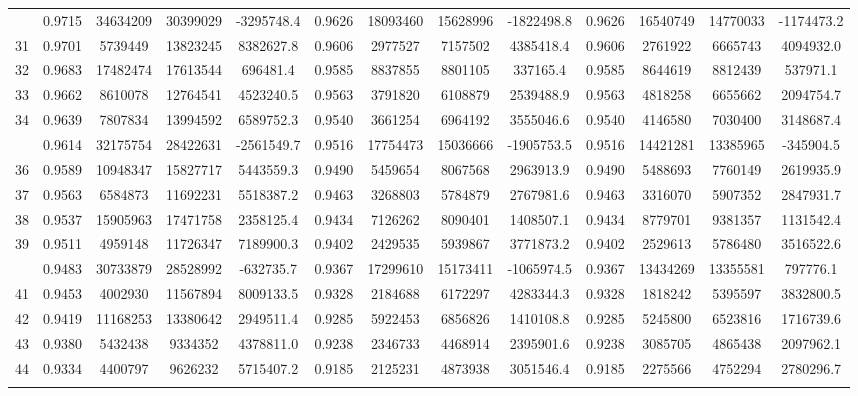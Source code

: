 \documentclass[
  12pt,
]{article}
\begin{document}
\begin{longtable}[t]{lcccccccccccc}
\addlinespace
30 & 0.9715 & 34634209 & 30399029 & -3295748.4 & 0.9626 & 18093460 & 15628996 & -1822498.8 & 0.9626 & 16540749 & 14770033 & -1174473.2\\
31 & 0.9701 & 5739449 & 13823245 & 8382627.8 & 0.9606 & 2977527 & 7157502 & 4385418.4 & 0.9606 & 2761922 & 6665743 & 4094932.0\\
32 & 0.9683 & 17482474 & 17613544 & 696481.4 & 0.9585 & 8837855 & 8801105 & 337165.4 & 0.9585 & 8644619 & 8812439 & 537971.1\\
33 & 0.9662 & 8610078 & 12764541 & 4523240.5 & 0.9563 & 3791820 & 6108879 & 2539488.9 & 0.9563 & 4818258 & 6655662 & 2094754.7\\
34 & 0.9639 & 7807834 & 13994592 & 6589752.3 & 0.9540 & 3661254 & 6964192 & 3555046.6 & 0.9540 & 4146580 & 7030400 & 3148687.4\\
\addlinespace
35 & 0.9614 & 32175754 & 28422631 & -2561549.7 & 0.9516 & 17754473 & 15036666 & -1905753.5 & 0.9516 & 14421281 & 13385965 & -345904.5\\
36 & 0.9589 & 10948347 & 15827717 & 5443559.3 & 0.9490 & 5459654 & 8067568 & 2963913.9 & 0.9490 & 5488693 & 7760149 & 2619935.9\\
37 & 0.9563 & 6584873 & 11692231 & 5518387.2 & 0.9463 & 3268803 & 5784879 & 2767981.6 & 0.9463 & 3316070 & 5907352 & 2847931.7\\
38 & 0.9537 & 15905963 & 17471758 & 2358125.4 & 0.9434 & 7126262 & 8090401 & 1408507.1 & 0.9434 & 8779701 & 9381357 & 1131542.4\\
39 & 0.9511 & 4959148 & 11726347 & 7189900.3 & 0.9402 & 2429535 & 5939867 & 3771873.2 & 0.9402 & 2529613 & 5786480 & 3516522.6\\
\addlinespace
40 & 0.9483 & 30733879 & 28528992 & -632735.7 & 0.9367 & 17299610 & 15173411 & -1065974.5 & 0.9367 & 13434269 & 13355581 & 797776.1\\
41 & 0.9453 & 4002930 & 11567894 & 8009133.5 & 0.9328 & 2184688 & 6172297 & 4283344.3 & 0.9328 & 1818242 & 5395597 & 3832800.5\\
42 & 0.9419 & 11168253 & 13380642 & 2949511.4 & 0.9285 & 5922453 & 6856826 & 1410108.8 & 0.9285 & 5245800 & 6523816 & 1716739.6\\
43 & 0.9380 & 5432438 & 9334352 & 4378811.0 & 0.9238 & 2346733 & 4468914 & 2395901.6 & 0.9238 & 3085705 & 4865438 & 2097962.1\\
44 & 0.9334 & 4400797 & 9626232 & 5715407.2 & 0.9185 & 2125231 & 4873938 & 3051546.4 & 0.9185 & 2275566 & 4752294 & 2780296.7\\
\addlinespace

\end{longtable}
\end{document}
